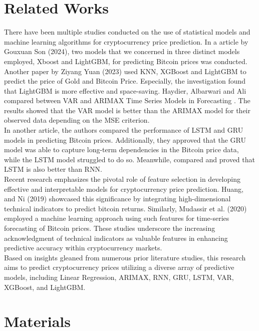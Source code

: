 \documentclass{ieeeojies}
\begin{document}
\section{Related Works}

\indent There have been multiple studies conducted on the use of statistical models and machine learning algorithms for cryptocurrency price prediction. In a article by Gouxuan Son (2024)\cite{b1}, two models that we concerned in three distinct models employed, Xboost and LightGBM, for predicting Bitcoin prices was conducted. Another paper by Ziyang Yuan (2023)\cite{b2} used KNN, XGBoost and LightGBM to predict the price of Gold and Bitcoin Price. Especially, the investigation found that LightGBM is more effective and space-saving.  Haydier, Albarwari and Ali compared  between  VAR  and  ARIMAX  Time  Series  Models  in Forecasting \cite{b3}. The results showed that the VAR model is better than the ARIMAX model for their observed data depending on the MSE criterion.\\
\indent In another article,\cite{b4} the authors compared the performance of LSTM and GRU models in predicting Bitcoin prices. Additionally, they approved that the GRU model was able to capture long-term dependencies in the Bitcoin price data, while the LSTM model struggled to do so. Meanwhile, \cite{b5} compared and proved that LSTM is also better than RNN.\\
\indent Recent research emphasizes the pivotal role of feature selection in developing effective and interpretable models for cryptocurrency price prediction. Huang, and Ni (2019) \cite{b6} showcased this significance by integrating high-dimensional technical indicators to predict bitcoin returns. Similarly, Mudassir et al. (2020) \cite{b7} employed a machine learning approach using such features for time-series forecasting of Bitcoin prices. These studies underscore the increasing acknowledgment of technical indicators as valuable features in enhancing predictive accuracy within cryptocurrency markets.\\
\indent Based on insights gleaned from numerous prior literature studies, this research aims to predict cryptocurrency prices utilizing a diverse array of predictive models, including Linear Regression, ARIMAX, RNN, GRU, LSTM, VAR, XGBoost, and LightGBM.

\section{Materials}
\end{document}
